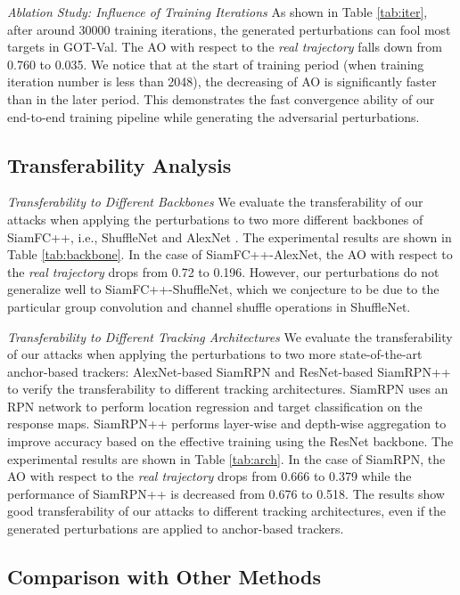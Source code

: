 \documentclass[journal]{IEEEtran}
\newcommand{\ie}{i.e.}
\begin{document}
\textit{Ablation Study: Influence of Training Iterations} As shown in Table \ref{tab:iter}, after around 30000 training iterations, the generated perturbations can fool most targets in GOT-Val. The AO with respect to the \textit{real trajectory} falls down from 0.760 to 0.035. We notice that at the start of training period (when training iteration number is less than 2048), the decreasing of AO is significantly faster than in the later period. This demonstrates the fast convergence ability of our end-to-end training pipeline while generating the adversarial perturbations.

\subsection{Transferability Analysis}

\textit{Transferability to Different Backbones} We evaluate the transferability of our attacks when applying the perturbations to two more different backbones of SiamFC++, \ie, ShuffleNet \cite{ShuffleNet} and AlexNet \cite{AlexNet}.
The experimental results are shown in Table \ref{tab:backbone}. In the case of SiamFC++-AlexNet, the AO with respect to the \textit{real trajectory} drops from 0.72 to 0.196. However, our perturbations do not generalize well to SiamFC++-ShuffleNet, which we conjecture to be due to the particular group convolution and channel shuffle operations in ShuffleNet.

\textit{Transferability to Different Tracking Architectures} We evaluate the transferability of our attacks when applying the perturbations to two more state-of-the-art anchor-based trackers: AlexNet-based SiamRPN \cite{SiamRPN} and ResNet-based SiamRPN++ \cite{SiamRPN++} to verify the transferability to different tracking architectures.
SiamRPN uses an RPN network to perform location regression and target classification on the response maps. SiamRPN++ performs layer-wise and depth-wise aggregation to improve accuracy based on the effective training using the ResNet backbone. The experimental results are shown in Table \ref{tab:arch}. In the case of SiamRPN, the AO with respect to the \textit{real trajectory} drops from 0.666 to 0.379 while the performance of SiamRPN++ is decreased from 0.676 to 0.518. The results show good transferability of our attacks to different tracking architectures, even if the generated perturbations are applied to anchor-based trackers.

\subsection{Comparison with Other Methods}
\end{document}
